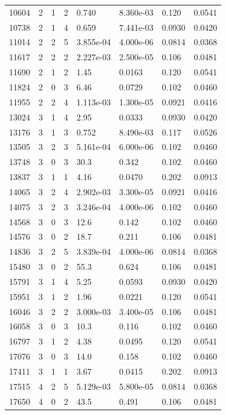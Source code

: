 \documentclass[preview]{standalone}
\begin{document}
{{{\begin{tabular}{L{1.2cm}C{1.2cm} C{0.3cm}C{0.5cm} C{1.4cm}C{1.4cm} C{1.4cm}C{1.4cm}}
  10604  &     2  & 1     &  2 &  0.740  & 8.360e-03  & 0.120 &  0.0541   \\ 
  10738  &     2  & 1     &  4 &  0.659  & 7.441e-03  & 0.0930 &  0.0420   \\ 
  11014  &     2  & 2     &  5 &  3.855e-04  & 4.000e-06  & 0.0814 &  0.0368   \\ 
  11617  &     2  & 2     &  2 &  2.227e-03  & 2.500e-05  & 0.106 &  0.0481   \\ 
  11690  &     2  & 1     &  2 &  1.45  & 0.0163  & 0.120 &  0.0541   \\ 
  11824  &     2  & 0     &  3 &  6.46  & 0.0729  & 0.102 &  0.0460   \\ 
  11955  &     2  & 2     &  4 &  1.113e-03  & 1.300e-05  & 0.0921 &  0.0416   \\ 
  13024  &     3  & 1     &  4 &  2.95  & 0.0333  & 0.0930 &  0.0420   \\ 
  13176  &     3  & 1     &  3 &  0.752  & 8.490e-03  & 0.117 &  0.0526   \\ 
  13505  &     3  & 2     &  3 &  5.161e-04  & 6.000e-06  & 0.102 &  0.0460   \\ 
  13748  &     3  & 0     &  3 &  30.3  & 0.342  & 0.102 &  0.0460   \\ 
  13837  &     3  & 1     &  1 &  4.16  & 0.0470  & 0.202 &  0.0913   \\ 
  14065  &     3  & 2     &  4 &  2.902e-03  & 3.300e-05  & 0.0921 &  0.0416   \\ 
  14075  &     3  & 2     &  3 &  3.246e-04  & 4.000e-06  & 0.102 &  0.0460   \\ 
  14568  &     3  & 0     &  3 &  12.6  & 0.142  & 0.102 &  0.0460   \\ 
  14576  &     3  & 0     &  2 &  18.7  & 0.211  & 0.106 &  0.0481   \\ 
  14836  &     3  & 2     &  5 &  3.839e-04  & 4.000e-06  & 0.0814 &  0.0368   \\ 
  15480  &     3  & 0     &  2 &  55.3  & 0.624  & 0.106 &  0.0481   \\ 
  15791  &     3  & 1     &  4 &  5.25  & 0.0593  & 0.0930 &  0.0420   \\ 
  15951  &     3  & 1     &  2 &  1.96  & 0.0221  & 0.120 &  0.0541   \\ 
  16046  &     3  & 2     &  2 &  3.000e-03  & 3.400e-05  & 0.106 &  0.0481   \\ 
  16058  &     3  & 0     &  3 &  10.3  & 0.116  & 0.102 &  0.0460   \\ 
  16797  &     3  & 1     &  2 &  4.38  & 0.0495  & 0.120 &  0.0541   \\ 
  17076  &     3  & 0     &  3 &  14.0  & 0.158  & 0.102 &  0.0460   \\ 
  17411  &     3  & 1     &  1 &  3.67  & 0.0415  & 0.202 &  0.0913   \\ 
  17515  &     4  & 2     &  5 &  5.129e-03  & 5.800e-05  & 0.0814 &  0.0368   \\ 
  17650  &     4  & 0     &  2 &  43.5  & 0.491  & 0.106 &  0.0481   \\ 
\hline 
\end{tabular} 

}}}
\end{document}
